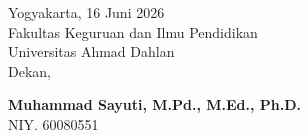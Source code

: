 \vspace{0.8cm}

\begin{flushright}
    \begin{minipage}{0.55\textwidth}
        \raggedright
        Yogyakarta, 16 Juni 2026 \\
        Fakultas Keguruan dan Ilmu Pendidikan \\
        Universitas Ahmad Dahlan \\
        Dekan,
        \vspace{1.2cm}
        
        \textbf{Muhammad Sayuti, M.Pd., M.Ed., Ph.D.} \\
        NIY. 60080551
    \end{minipage}
\end{flushright}